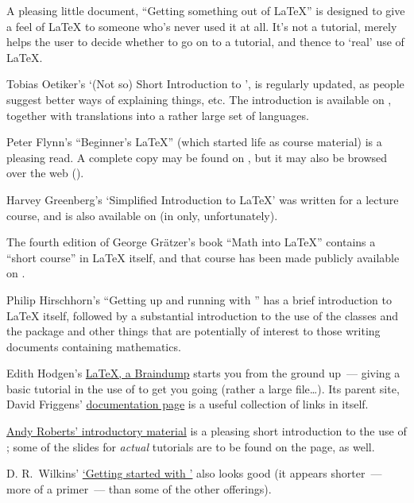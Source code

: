 
A pleasing little document, ``Getting something out of \LaTeX{}'' is
designed to give a feel of \LaTeX{} to someone who's never used it at
all.  It's not a tutorial, merely helps the user to decide whether to
go on to a tutorial, and thence to `real' use of \LaTeX{}.

Tobias Oetiker's `(Not so) Short Introduction to \LaTeXe{}', is
regularly updated, as people suggest better ways of explaining things,
etc.  The introduction is available on , together with
translations into a rather large set of languages.

Peter Flynn's ``Beginner's \LaTeX{}'' (which started life as course
material) is a pleasing read.  A complete copy may be found on
, but it may also be browsed over the web
().

Harvey Greenberg's `Simplified Introduction to \LaTeX{}' was written
for a lecture course, and is also available on  (in \PS{}
only, unfortunately).

The fourth edition of George Gr\"atzer's book ``Math into \LaTeX{}''
contains a ``short course'' in \LaTeX{} itself, and that course has
been made publicly available on .

Philip Hirschhorn's ``Getting up and running with \AMSLaTeX{}'' has a
brief introduction to \LaTeX{} itself, followed by a substantial
introduction to the use of the  classes and the
 package and other things that are potentially of
interest to those writing documents containing mathematics.

Edith Hodgen's %
\href{http://www.mcs.vuw.ac.nz/~david/latex/notes.pdf}{\LaTeX{}, a Braindump}
starts you from the ground up~--- giving a basic tutorial in the use
of  to get you going (rather a large file\dots{}).
Its parent site, David Friggens' %
\href{http://www.mcs.vuw.ac.nz/~david/latex/}{documentation page} is a
useful collection of links in itself.

\href{http://www.andy-roberts.net/misc/latex/}{Andy Roberts' introductory material}
is a pleasing short introduction to the use of \AllTeX{}; some of the
slides for \emph{actual} tutorials are to be found on the page, as
well.

D. R.~Wilkins' %
\href{http://www.maths.tcd.ie/~dwilkins/LaTeXPrimer/}{`Getting started with \latex{}'}
also looks good (it appears shorter~--- more of a primer~--- than some
of the other offerings).


